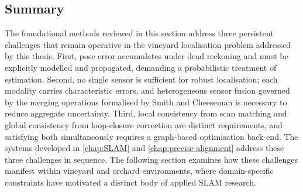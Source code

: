 \subsection{Summary}
\label{subsec:robot-localisation-summary}

The foundational methods reviewed in this section address three persistent challenges that remain operative in the vineyard localisation problem addressed by this thesis. First, pose error accumulates under dead reckoning and must be explicitly modelled and propagated, demanding a probabilistic treatment of estimation. Second, no single sensor is sufficient for robust localisation; each modality carries characteristic errors, and heterogeneous sensor fusion governed by the merging operations formalised by Smith and Cheeseman is necessary to reduce aggregate uncertainty. Third, local consistency from scan matching and global consistency from loop-closure correction are distinct requirements, and satisfying both simultaneously requires a graph-based optimisation back-end. The systems developed in \cref{chap:SLAM} and \cref{chap:precise-alignment} address these three challenges in sequence. The following section examines how these challenges manifest within vineyard and orchard environments, where domain-specific constraints have motivated a distinct body of applied SLAM research.

